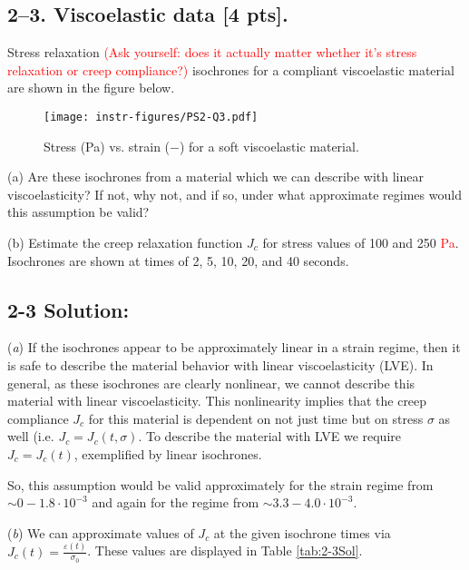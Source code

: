 \bigskip
\subsection*{2--3. \textbf{Viscoelastic data} [4 pts].} 
Stress relaxation \textcolor{red}{(Ask yourself: does it actually matter whether it's stress relaxation or creep compliance?)} isochrones for a compliant viscoelastic material are shown in the figure below.  

\begin{figure}[H]
\vspace{-1em}
\centering
\texttt{[image: instr-figures/PS2-Q3.pdf]}
\caption{\small{Stress (Pa) vs. strain ($-$) for a soft viscoelastic material.}}
\end{figure}

\vspace{-1em}
(a) Are these isochrones from a material which we can describe with linear viscoelasticity? If not, why not, and if so, under what approximate regimes would this assumption be valid? 

\medskip
(b) Estimate the creep relaxation function $J_c$ for stress values of 100 and 250 \textcolor{red}{Pa}. Isochrones are shown at times of 2, 5, 10, 20, and 40 seconds.   

\subsection*{\textbf{2-3 Solution:}}
(\textit{a}) If the isochrones appear to be approximately linear in a strain regime, then it is safe to describe the material behavior with linear viscoelasticity (LVE). In general, as these isochrones are clearly nonlinear, we cannot describe this material with linear viscoelasticity. This nonlinearity implies that the creep compliance $J_c$ for this material is dependent on not just time but on stress $\sigma$ as well (i.e. $J_c=J_c(t,\sigma)$. To describe the material with LVE we require $J_c=J_c(t)$, exemplified by linear isochrones.

So, this assumption would be valid approximately for the strain regime from $\sim 0-1.8\cdot10^{-3}$ and again for the regime from $\sim 3.3-4.0\cdot10^{-3}$.

(\textit{b}) We can approximate values of $J_c$ at the given isochrone times via $J_c(t)=\frac{\varepsilon(t)}{\sigma_0}$. These values are displayed in Table \ref{tab:2-3Sol}. 

